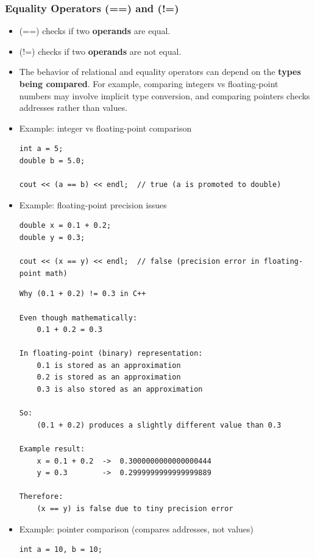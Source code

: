 \documentclass[10pt]{article}
\begin{document}
\newpage

\subsubsection{Equality Operators (==) and (!=)}
\begin{itemize}
	\item (==) checks if two \textbf{operands} are equal.
	\item (!=) checks if two \textbf{operands} are not equal.

	\item The behavior of relational and equality operators can depend on the \textbf{types being compared}. For example, comparing integers vs floating-point numbers may involve implicit type conversion, and comparing pointers checks addresses rather than values.

	\item Example: integer vs floating-point comparison
	\begin{verbatim}
int a = 5;
double b = 5.0;

cout << (a == b) << endl;  // true (a is promoted to double)
	\end{verbatim}

	\item Example: floating-point precision issues
	\begin{verbatim}
double x = 0.1 + 0.2;
double y = 0.3;

cout << (x == y) << endl;  // false (precision error in floating-point math)
	\end{verbatim}

	\begin{verbatim}
Why (0.1 + 0.2) != 0.3 in C++

Even though mathematically:
    0.1 + 0.2 = 0.3

In floating-point (binary) representation:
    0.1 is stored as an approximation
    0.2 is stored as an approximation
    0.3 is also stored as an approximation

So:
    (0.1 + 0.2) produces a slightly different value than 0.3

Example result:
    x = 0.1 + 0.2  ->  0.3000000000000000444
    y = 0.3        ->  0.2999999999999999889

Therefore:
    (x == y) is false due to tiny precision error
\end{verbatim}

	\item Example: pointer comparison (compares addresses, not values)
	\begin{verbatim}
int a = 10, b = 10;


\end{verbatim}
\end{itemize}
\end{document}
